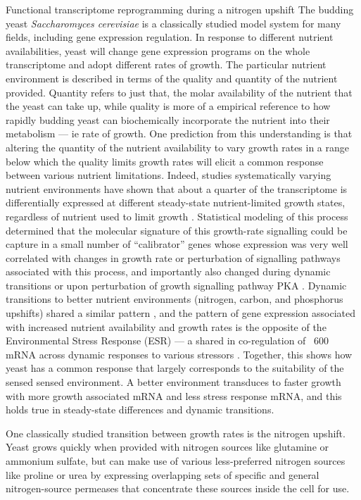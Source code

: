 Functional transcriptome reprogramming during a
nitrogen upshift The budding yeast \textit{Saccharomyces cerevisiae}
is a
classically studied model system for many fields, including gene
expression regulation. In response to different nutrient
availabilities, yeast will change gene expression programs on the
whole transcriptome and adopt different rates of growth. The
particular nutrient environment is described in terms of the quality
and quantity of the nutrient provided. Quantity refers to just that,
the molar availability of the nutrient that the yeast can take up,
while quality is more of a empirical reference to how rapidly budding
yeast can biochemically incorporate the nutrient into their metabolism
--- ie rate of growth. One prediction from this understanding is that
altering the quantity of the nutrient availability to vary growth
rates in a range below which the quality limits growth rates will
elicit a common response between various nutrient limitations.
Indeed, studies systematically varying nutrient environments have
shown that about a quarter of the transcriptome is differentially
expressed at different steady-state nutrient-limited growth states,
regardless of nutrient used to limit growth 
\citep{brauer2008coordination,regenberg2006growth}. 
Statistical modeling of this process
determined that the molecular signature of this growth-rate signalling
could be capture in a small number of “calibrator” genes whose
expression was very well correlated with changes in growth rate or
perturbation of signalling pathways associated with this process, and
importantly also changed during dynamic transitions or upon
perturbation of growth signalling pathway PKA 
\citep{airoldi2009predicting}.
Dynamic transitions to better nutrient environments (nitrogen, carbon,
and phosphorus upshifts) shared a similar pattern 
\citep{conway2012glucose}, 
and the pattern of gene expression associated with increased
nutrient availability and growth rates is the opposite of the
Environmental Stress Response (ESR) --- a shared in co-regulation of
~600 mRNA across dynamic responses to various stressors 
\citep{gasch2000genomic}. 
Together, this shows how yeast has a common response that
largely corresponds to the suitability of the sensed sensed
environment. A better environment transduces to faster growth with
more growth associated mRNA and less stress response mRNA, and this
holds true in steady-state differences and dynamic transitions.  

One
classically studied transition between growth rates is the nitrogen
upshift. Yeast grows quickly when provided with nitrogen sources like
glutamine or ammonium sulfate, but can make use of various
less-preferred nitrogen sources like proline or urea by expressing
overlapping sets of specific and general nitrogen-source permeases
that concentrate these sources inside the cell for use.  

